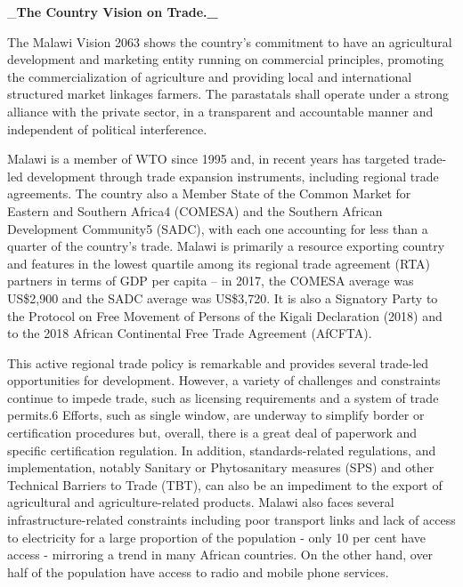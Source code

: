 \documentclass[
]{book}
\begin{document}
\_\textbf{The Country Vision on Trade.\_}

The Malawi Vision 2063 shows the country's commitment to have an agricultural development and marketing entity running on commercial principles, promoting the
commercialization of agriculture and providing local and international structured market linkages farmers. The parastatals shall operate under a strong alliance
with the private sector, in a transparent and accountable manner and independent of political interference.

Malawi is a member of WTO since 1995 and, in recent years has targeted trade-led development through trade expansion instruments, including regional trade
agreements. The country also a Member State of the Common Market for Eastern and Southern Africa4 (COMESA) and the Southern African Development Community5
(SADC), with each one accounting for less than a quarter of the country's trade. Malawi is primarily a resource exporting country and features in the lowest
quartile among its regional trade agreement (RTA) partners in terms of GDP per capita -- in 2017, the COMESA average was US\$2,900 and the SADC average was
US\$3,720. It is also a Signatory Party to the Protocol on Free Movement of Persons of the Kigali Declaration (2018) and to the 2018 African Continental Free
Trade Agreement (AfCFTA).

This active regional trade policy is remarkable and provides several trade-led opportunities for development. However, a variety of challenges and constraints
continue to impede trade, such as licensing requirements and a system of trade permits.6 Efforts, such as single window, are underway to simplify border or
certification procedures but, overall, there is a great deal of paperwork and specific certification regulation. In addition, standards-related regulations, and
implementation, notably Sanitary or Phytosanitary measures (SPS) and other Technical Barriers to Trade (TBT), can also be an impediment to the export of
agricultural and agriculture-related products. Malawi also faces several infrastructure-related constraints including poor transport links and lack of access to
electricity for a large proportion of the population - only 10 per cent have access - mirroring a trend in many African countries. On the other hand, over half
of the population have access to radio and mobile phone services.
\end{document}
